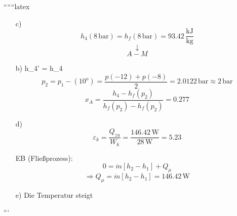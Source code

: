 ``````latex


\begin{itemize}
    \item[c)] 
    \[
    h_4 (8 \, \text{bar}) = h_f (8 \, \text{bar}) = 93.42 \, \frac{\text{kJ}}{\text{kg}}
    \]
    \[
    \downarrow
    \]
    \[
    A-M
    \]
    
    \item[b)] 
     \quad h_{4'} = h_4
    \[
    p_{2} = p_{1} - (10^o) = \frac{p(-12) + p(-8)}{2} = 2.0122 \, \text{bar} \approx 2 \, \text{bar}
    \]
    \[
    x_{A} = \frac{h_4 - h_f (p_2)}{h_f (p_2) - h_f (p_2)} = 0.277
    \]
    
    \item[d)] 
    \[
    \varepsilon_k = \frac{Q_{zu}}{W_k} = \frac{146.42 \, \text{W}}{28 \, \text{W}} = 5.23
    \]
    
    \item[EB (Fließprozess):] 
    \[
    0 = \dot{m} [h_2 - h_1] + Q_{\mu}
    \]
    \[
    \Rightarrow Q_{\mu} = \dot{m} [h_2 - h_1] = 146.42 \, \text{W}
    \]
    
    \item[e)] 
    Die Temperatur steigt
\end{itemize}

```